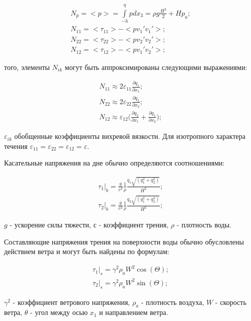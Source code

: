 \documentclass[14pt]{extreport}
\begin{document}

\begin{gather} 
N_p = <p> = \int\limits^\eta_{-h} pdx_3=\rho g \frac{H^2}{2} + Hp_a; \nonumber\\
N_{11} = <\tau_{11}>-<pv_1'v_1'>; \nonumber\\
N_{22} = <\tau_{22}>-<pv_2'v_2'>; \nonumber\\
N_{12} = <\tau_{12}>-<pv_1'v_2'>;
\end{gather}

 того, элементы $N_{ik}$ могут быть аппроксимированы следующими выражениями:

\begin{gather} 
N_{11} \approx 2 \varepsilon_{11}\frac{\partial q_1}{\partial x_1}; \nonumber\\
N_{22} \approx 2 \varepsilon_{22}\frac{\partial q_2}{\partial x_2}; \nonumber\\
N_{12} \approx \varepsilon_{12}\bigg(\frac{\partial q_2}{\partial x_1}+\frac{\partial q_1}{\partial x_2}\bigg);
\end{gather}


 $\varepsilon_{ik}$ обобщенные коэффициенты вихревой вязкости. Для изотропного характера течения $\varepsilon_{11}=\varepsilon_{22}=\varepsilon_{12}=\varepsilon.$

Касательные напряжения на дне обычно определяются соотношениями:

\begin{gather}
\tau_1\bigg|_b = \frac{g}{c^2} \frac{1}{\rho} \frac{q_1\sqrt{(q_1^2+q_2^2)}}{H^2}; \nonumber\\
\tau_2\bigg|_b = \frac{g}{c^2} \frac{1}{\rho} \frac{q_2\sqrt{(q_1^2+q_2^2)}}{H^2};
\end{gather}

 $g$ - ускорение силы тяжести, $с$ - коэффициент трения, $\rho$ - плотность воды. 

Составляющие напряжения трения на поверхности воды обычно обусловлены действием ветра и могут быть найдены по формулам:

\begin{gather}
\tau_1\bigg|_s=\gamma^2\rho_aW^2\cos(\Theta); \nonumber\\
\tau_2\bigg|_s=\gamma^2\rho_aW^2\sin(\Theta);
\end{gather} 

 $\gamma^2$ - коэффициент ветрового напряжения, $\rho_a$ - плотность воздуха, $W$ - скорость ветра, $\theta$ - угол между осью $x_1$ и направлением ветра.
\end{document}
